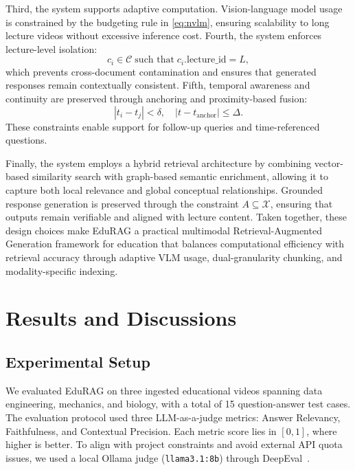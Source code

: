 \documentclass[conference]{IEEEtran}
\begin{document}
    Third, the system supports adaptive computation. Vision-language model usage is constrained by the budgeting rule in \eqref{eq:nvlm}, ensuring scalability to long lecture videos without excessive inference cost. Fourth, the system enforces lecture-level isolation:
    \begin{equation}
    c_i \in \mathcal{C} \;\text{such that}\; c_i.\text{lecture\_id} = L,
    \end{equation}
    which prevents cross-document contamination and ensures that generated responses remain contextually consistent. Fifth, temporal awareness and continuity are preserved through anchoring and proximity-based fusion:
    \begin{equation}
    |t_i - t_j| < \delta, \quad |t - t_{\text{anchor}}| \leq \Delta.
    \end{equation}
    These constraints enable support for follow-up queries and time-referenced questions.

    Finally, the system employs a hybrid retrieval architecture by combining vector-based similarity search with graph-based semantic enrichment, allowing it to capture both local relevance and global conceptual relationships. Grounded response generation is preserved through the constraint $A \subseteq \mathcal{X}$, ensuring that outputs remain verifiable and aligned with lecture content. Taken together, these design choices make EduRAG a practical multimodal Retrieval-Augmented Generation framework for education that balances computational efficiency with retrieval accuracy through adaptive VLM usage, dual-granularity chunking, and modality-specific indexing.

    \section{Results and Discussions}

    \subsection{Experimental Setup}
    We evaluated EduRAG on three ingested educational videos spanning data engineering, mechanics, and biology, with a total of 15 question-answer test cases. The evaluation protocol used three LLM-as-a-judge metrics: Answer Relevancy, Faithfulness, and Contextual Precision. Each metric score lies in $[0,1]$, where higher is better. To align with project constraints and avoid external API quota issues, we used a local Ollama judge (\texttt{llama3.1:8b}) through DeepEval~\cite{deepeval,ollama}.
\end{document}

